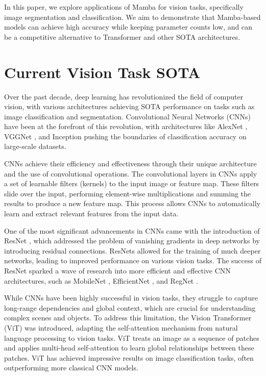 \documentclass[conference]{IEEEtran}
\begin{document}
In this paper, we explore applications of Mamba for vision tasks, specifically image segmentation and classification. We aim to demonstrate that Mamba-based models can achieve high accuracy while keeping parameter counts low, and can be a competitive alternative to Transformer and other SOTA architectures.


\section{Current Vision Task SOTA}
Over the past decade, deep learning has revolutionized the field of computer vision, with various architectures achieving SOTA performance on tasks such as image classification and segmentation. Convolutional Neural Networks (CNNs)\cite{lecundocument} have been at the forefront of this revolution, with architectures like AlexNet \cite{krizhevsky2012imagenet}, VGGNet \cite{simonyan2014very}, and Inception \cite{szegedy2015going} pushing the boundaries of classification accuracy on large-scale datasets.

CNNs achieve their efficiency and effectiveness through their unique architecture and the use of convolutional operations. The convolutional layers in CNNs apply a set of learnable filters (kernels) to the input image or feature map. These filters slide over the input, performing element-wise multiplications and summing the results to produce a new feature map. This process allows CNNs to automatically learn and extract relevant features from the input data.

One of the most significant advancements in CNNs came with the introduction of ResNet \cite{he2016deep}, which addressed the problem of vanishing gradients in deep networks by introducing residual connections. ResNets allowed for the training of much deeper networks, leading to improved performance on various vision tasks. The success of ResNet sparked a wave of research into more efficient and effective CNN architectures, such as MobileNet \cite{howard2017mobilenets}, EfficientNet \cite{tan2019efficientnet}, and RegNet \cite{radosavovic2020designing}.

While CNNs have been highly successful in vision tasks, they struggle to capture long-range dependencies and global context, which are crucial for understanding complex scenes and objects. To address this limitation, the Vision Transformer (ViT) \cite{dosovitskiy2021image} was introduced, adapting the self-attention mechanism from natural language processing to vision tasks. ViT treats an image as a sequence of patches and applies multi-head self-attention to learn global relationships between these patches. ViT has achieved impressive results on image classification tasks, often outperforming more classical CNN models.
\end{document}
